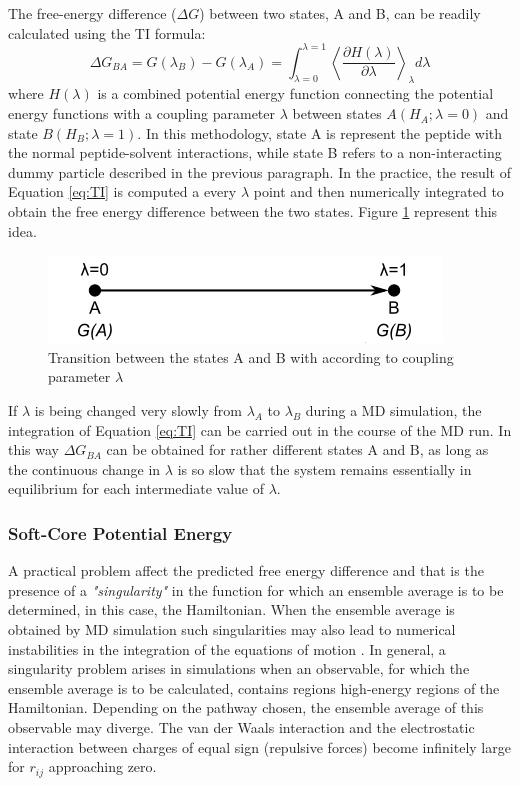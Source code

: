 The free-energy diﬀerence ($\Delta G$) between two states, A and B, can be readily calculated using the TI formula:
\begin{equation}
    \Delta G_{BA}=G(\lambda_{B})-G(\lambda_{A})=\int_{\lambda =0}^{\lambda =1}\left \langle \frac{\partial H(\lambda )}{\partial \lambda } \right \rangle_\lambda d\lambda
    \label{eq:TI}
\end{equation}
 where $H(\lambda)$ is a combined potential energy function connecting the potential energy functions with a coupling parameter $\lambda$ between states $A (H_{A}; \lambda =0) $ and state $B (H_{B}; \lambda =1)$. In this methodology, state A is represent the peptide with the normal peptide-solvent interactions, while state B refers to a non-interacting dummy particle described in the previous paragraph. In the practice, the result of Equation \ref{eq:TI} is computed a every $\lambda$ point and then numerically integrated to obtain the free energy difference between the two states. Figure \ref{fig:GA_to_GB} represent this idea. 
 \begin{figure}[h]
     \centering
     \includegraphics[scale=0.5]{Figures/Chapter 3/GA_to_GB.png}
     \caption{Transition between the states A and B with according to coupling parameter $\lambda$}
     \label{fig:GA_to_GB}
 \end{figure}
 
If $\lambda$ is being changed very slowly from $\lambda_A$ to $\lambda_B$ during a MD simulation, the integration of Equation \ref{eq:TI} can be carried out in the course of the MD run. In this way $\Delta G_{BA}$ can be obtained for rather different states A and B, as long as the continuous change in $\lambda$ is so slow that the system remains essentially in equilibrium for each intermediate value of $\lambda$.

\subsubsection{Soft-Core Potential Energy}\label{subsubsec:softcore}

A practical problem affect the predicted free energy difference and that is the presence of a \textit{"singularity"} in the function for which an ensemble average is to be determined, in this case, the Hamiltonian. When the ensemble average is obtained by MD simulation such singularities may also lead to numerical instabilities in the integration of the equations of motion \cite{beutler1994avoiding}. In general, a singularity problem arises in simulations when an observable, for which the ensemble average is to be calculated, contains regions high-energy regions of the Hamiltonian. Depending on the pathway chosen, the ensemble average of this observable may diverge. The van der Waals interaction and the electrostatic interaction between charges of equal sign (repulsive forces) become infinitely large for $r_{ij}$ approaching zero.  

